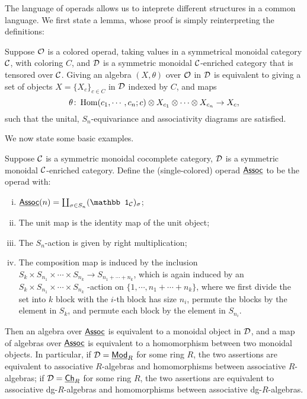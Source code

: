 \documentclass[twoside]{article}
\begin{document}
The language of operads allows us to inteprete different structures
in a common language. We first state a lemma, whose proof is simply reinterpreting
the definitions:

\begin{lemma}
    Suppose $\cal O$ is a colored operad, taking values in a symmetrical
    monoidal category $\cal C$, with coloring $C$, and $\cal D$ is a 
    symmetric monoidal $\cal C$-enriched category that is tensored over $\cal C$. Giving an algebra
    $(X,\theta)$ over $\cal O$ in $\cal D$ is equivalent to giving a set of objects
    $X=\{X_c\}_{c\in C}$ in $\cal D$ indexed by $C$, and maps 
    \[\theta\colon\operatorname{Hom}(c_1,\cdots,c_n;c)\otimes X_{c_1}\otimes\cdots\otimes X_{c_n}\to X_c,\]
    such that the unital, $S_n$-equivariance and associativity diagrams are satisfied.
\end{lemma}

We now state some basic examples.

\begin{example}\label{eg1}
    Suppose $\cal C$ is a symmetric monoidal cocomplete category,
    $\cal D$ is a symmetric monoidal $\cal C$-enriched category. Define the 
    (single-colored) operad $\underline{\mathsf{Assoc}}$ to be the operad with:
    \begin{enumerate}[i)]
        \item $\Assoc(n)=\coprod_{\sigma\in S_n}(\mathbb1_{\cal C})_{\sigma}$;
        \item The unit map is the identity map of the unit object;
        \item The $S_n$-action is given by right multiplication;
        \item The composition map is induced by the inclusion 
        $S_k\times S_{n_1}\times\cdots\times S_{n_k}\to S_{n_1+\cdots+n_k}$,
        which is again induced by an $S_k\times S_{n_1}\times\cdots\times S_{n_k}$%
        -action on $\{1,\cdots,n_1+\cdots+n_k\}$, where we first divide
        the set into $k$ block with the $i$-th block has size $n_i$, permute the blocks
        by the element in $S_k$, and permute each block by the element in $S_{n_i}$.
    \end{enumerate}
    Then an algebra over $\underline{\mathsf{Assoc}}$ is equivalent to a monoidal object in $\cal D$,
    and a map of algebras over $\underline{\mathsf{Assoc}}$ is equivalent to a homomorphism
    between two monoidal objects. In particular, if $\mathcal D=\underline{\smash{\mathsf{Mod}}}_R$ for some
    ring $R$, the two assertions are equivalent to associative $R$-algebras
    and homomorphisms between associative $R$-algebras; if $\mathcal D=\underline{\mathsf{Ch}}_R$
    for some ring $R$, the two assertions are equivalent to
    associative dg-$R$-algebras and homomorphisms between 
    associative dg-$R$-algebras.
\end{example}
\end{document}
